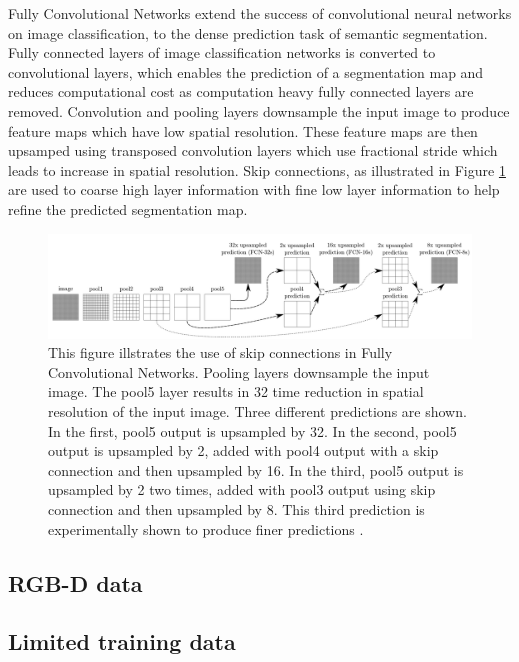 Fully Convolutional Networks \cite{DBLP:journals/corr/LongSD14} extend the success of convolutional neural networks on image classification, to the dense prediction task of semantic segmentation. Fully connected layers of image classification networks is converted to convolutional layers, which enables the prediction of a segmentation map and reduces computational cost as computation heavy fully connected layers are removed. Convolution and pooling layers downsample the input image to produce feature maps which have low spatial resolution. These feature maps are then upsamped using transposed convolution layers which use fractional stride which leads to increase in spatial resolution. Skip connections, as illustrated in Figure \ref{Fig:fcn} are used to coarse high layer information with fine low layer information to help refine the predicted segmentation map. 

	\begin{figure}
		\centering
		\includegraphics[width=1\linewidth]{images/fcn_skip}
		\caption{This figure illstrates the use of skip connections in Fully Convolutional Networks. Pooling layers downsample the input image. The pool5 layer results in 32 time reduction in spatial resolution of the input image. Three different predictions are shown. In the first, pool5 output is upsampled by 32. In the second, pool5 output is upsampled by 2, added with pool4 output with a skip connection and then upsampled by 16. In the third, pool5 output is upsampled by 2 two times, added with pool3 output using skip connection and then upsampled by 8. This third prediction is experimentally shown to produce finer predictions \cite{DBLP:journals/corr/LongSD14}.}
		\label{Fig:fcn}
	\end{figure}

\subsection{RGB-D data}

\subsection{Limited training data}

